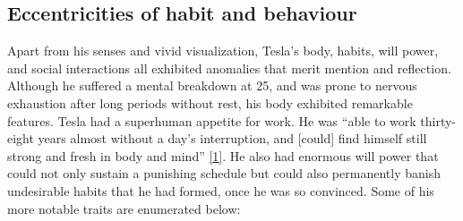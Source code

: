 \documentclass[
  12pt,
  british,
  a4paper,
  rgb,
  dvipsnames,
  svgnames,
  hyphens]{article}
\begin{document}
\hypertarget{eccentricities-of-habit-and-behaviour}{%
\subsection{Eccentricities of habit and
behaviour}\label{eccentricities-of-habit-and-behaviour}}

Apart from his senses and vivid visualization, Tesla's body, habits,
will power, and social interactions all exhibited anomalies that merit
mention and reflection. Although he suffered a mental breakdown at 25,
and was prone to nervous exhaustion after long periods without rest, his
body exhibited remarkable features. Tesla had a superhuman appetite for
work. He was ``able to work thirty-eight years almost without a day's
interruption, and {[}could{]} find himself still strong and fresh in
body and mind'' \protect\hyperlink{ref-john83}{{[}1{]}}. He also had
enormous will power that could not only sustain a punishing schedule but
could also permanently banish undesirable habits that he had formed,
once he was so convinced. Some of his more notable traits are enumerated
below:
\end{document}
